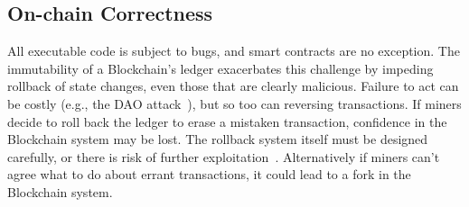 
\subsection{On-chain Correctness}
All executable code is subject to bugs, and smart contracts are no exception.
The immutability of a Blockchain's ledger exacerbates this challenge by impeding rollback of state changes, even those that are clearly malicious.
Failure to act can be costly (e.g., the DAO attack~\cite{dao}), but so too can reversing transactions.
If miners decide to roll back the ledger to erase a mistaken transaction,  
confidence in the Blockchain system may be lost. The rollback system itself 
must be designed carefully, or there is risk of further 
exploitation~\cite{arxiv:AviSafSha18}.
Alternatively if miners can't agree what to do about errant transactions, it 
could lead to a fork in the Blockchain system.


